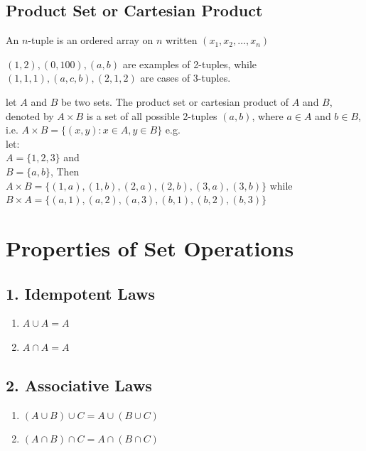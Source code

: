 \subsection{Product Set or Cartesian Product}
\begin{para}
    An $n$-tuple is an ordered array on $n$ written $(x_1,x_2,\ldots,x_n)$
\end{para}
\begin{para}
    $(1,2), (0, 100), (a, b)$ are examples of 2-tuples, while $(1,1,1), (a,c,b), (2,1,2)$ are cases of 3-tuples.
\end{para}

\begin{para}
    let $A$ and $B$ be two sets. The product set or cartesian product of $A$ and $B$, denoted by $A \times B$ is a set of all possible 2-tuples $(a,b)$, where $a \in A$ and $b \in B$, i.e. $A \times B = \{(x,y): x \in A, y \in B\}$ e.g. \\
    let:\\
    $A=\{1,2,3\}$ and\\
    $B=\{a,b\}$, Then \\
    $A \times B = \{(1,a),(1,b),(2,a),(2,b),(3,a),(3,b)\}$ while\\
    $B \times A = \{(a,1),(a,2),(a,3),(b,1),(b,2),(b,3)\}$
\end{para}

\section{Properties of Set Operations}


\subsection*{1. Idempotent Laws}
\begin{enumerate}
    \item $A \cup A = A$
    \item $A \cap A = A$
\end{enumerate}

\subsection*{2. Associative Laws}
\begin{enumerate}
    \item $(A \cup B) \cup C = A \cup (B \cup C) $
    \item $(A \cap B) \cap C = A \cap (B \cap C) $
\end{enumerate}


